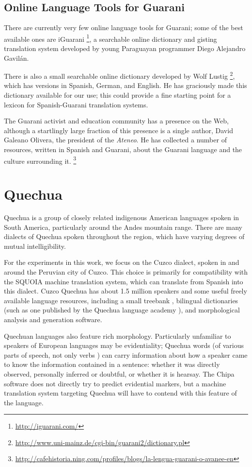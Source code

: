 \subsection{Online Language Tools for Guarani}
There are currently very few online language tools for Guarani; some of the
best available ones are iGuarani \footnote{\url{http://iguarani.com/}}, a
searchable online dictionary and gisting translation system developed by young
Paraguayan programmer Diego Alejandro Gavilán.

There is also a small searchable online dictionary developed by Wolf Lustig
\footnote{\url{http://www.uni-mainz.de/cgi-bin/guarani2/dictionary.pl}},
which has versions in Spanish, German, and English. He has graciously made this
dictionary available for our use; this could provide a fine starting point for
a lexicon for Spanish-Guarani translation systems.

The Guarani activist and education community has a presence on the Web,
although a startlingly large fraction of this presence is a single author,
David Galeano Olivera, the president of the \emph{Ateneo}.
He has collected a number of resources, written in Spanish
and Guarani, about the Guarani language and the culture surrounding it.
\footnote{\url{http://cafehistoria.ning.com/profiles/blogs/la-lengua-guarani-o-avanee-en}}

\section{Quechua}
\label{sec:quechua}
Quechua is a group of closely related indigenous American languages spoken in
South America, particularly around the Andes mountain range.
There are many dialects of Quechua spoken throughout the region, which have
varying degrees of mutual intelligibility.

For the experiments in this work, we focus on the Cuzco dialect, spoken in and
around the Peruvian city of Cuzco. This choice is primarily for compatibility
with the SQUOIA machine translation system, which can translate from Spanish
into this dialect. Cuzco Quechua has about 1.5 million speakers and some useful
freely available language resources, including a small treebank
\cite{rios2009quechua}, bilingual dictionaries (such as one published by the
Quechua language academy \cite{academiamayor}), and morphological analysis and
generation software.

Quechuan languages also feature rich morphology. Particularly unfamiliar to
speakers of European languages may be evidentiality; Quechua words (of various
parts of speech, not only verbs \cite{coronel2002quechua}) can carry
information about how a speaker came to know the information contained in a
sentence: whether it was directly observed, personally inferred or doubtful, or
whether it is hearsay.
The Chipa software does not directly try to predict evidential markers, but a
machine translation system targeting Quechua will have to contend with this
feature of the language.
